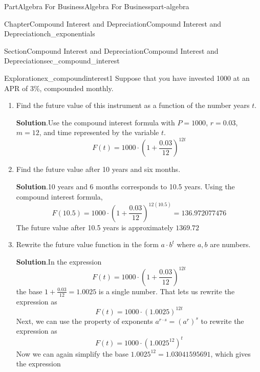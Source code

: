 \documentclass{tufte-book}
\newcommand{\blocktitlefont}{\relax}
\numberwithin{equation}{chapter}
\begin{document}
\begin{partptx}{Part}{Algebra For Business}{}{Algebra For Business}{}{}{part-algebra}
\begin{chapterptx}{Chapter}{Compound Interest and Depreciation}{}{Compound Interest and Depreciation}{}{}{ch_exponentials}
\begin{sectionptx}{Section}{Compound Interest and Depreciation}{}{Compound Interest and Depreciation}{}{}{sec_compound_interest}
\begin{exploration}{Exploration}{}{ex_compoundinterest1}%
Suppose that you have invested \textdollar{}1000 at an APR of 3\%, compounded monthly.%
\begin{enumerate}[font=\bfseries,label=(\alph*),ref=\alph*]%
\item{}Find the future value of this instrument as a function of the number years \(t\).%
\par\smallskip%
\noindent\textbf{\blocktitlefont Solution}.\hypertarget{ex_compoundinterest1-2-2}{}\quad{}Use the compound interest formula with \(P=1000\), \(r=0.03\), \(m=12\), and time represented by the variable \(t\).%
\begin{equation*}
F(t) = 1000\cdot \left( 1 + \frac{0.03}{12}\right)^{12 t}
\end{equation*}
%
\item{}Find the future value after 10 years and six months.%
\par\smallskip%
\noindent\textbf{\blocktitlefont Solution}.\hypertarget{ex_compoundinterest1-3-2}{}\quad{}10 years and 6 months corresponds to 10.5 years.  Using the compound interest formula,%
\begin{equation*}
F(10.5) = 1000\cdot \left( 1 + \frac{0.03}{12}\right)^{12 (10.5)} = 136.972077476
\end{equation*}
The future value after 10.5 years is approximately \textdollar{}\(1369.72\)%
\item{}Rewrite the future value function in the form \(a\cdot b^t\) where \(a,b\) are numbers.%
\par\smallskip%
\noindent\textbf{\blocktitlefont Solution}.\hypertarget{ex_compoundinterest1-4-2}{}\quad{}In the expression%
\begin{equation*}
F(t) = 1000\cdot \left( 1 + \frac{0.03}{12}\right)^{12 t}
\end{equation*}
the base \(1 + \frac{0.03}{12} = 1.0025 \) is a single number.  That lets us rewrite the expression as%
\begin{equation*}
F(t) = 1000\cdot \left( 1.0025 \right)^{12 t}
\end{equation*}
Next, we can use the property of exponents \(a^{r\cdot s} = {\left(a^{r}\right)}^s\) to rewrite the expression as%
\begin{equation*}
F(t) = 1000\cdot \left( 1.0025^{12} \right)^{t}
\end{equation*}
Now we can again simplify the base \(1.0025^{12} = 1.03041595691\), which gives the expression%
\begin{equation*}

\end{equation*}
\end{enumerate}
\end{exploration}
\end{sectionptx}
\end{chapterptx}
\end{partptx}
\end{document}
